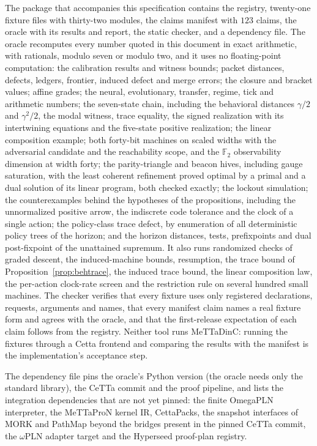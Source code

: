 \documentclass[11pt]{article}
\newcommand{\F}{\mathbb{F}}
\theoremstyle{definition}
\theoremstyle{plain}
\begin{document}
The package that accompanies this specification contains the registry, twenty-one fixture files
with thirty-two modules, the claims manifest with $123$ claims, the oracle with its results and
report, the static checker, and a dependency file. The oracle recomputes every number quoted in this
document in exact arithmetic, with rationals, modulo seven or modulo two, and it uses no
floating-point computation: the calibration results and witness
bounds; packet distances, defects, ledgers, frontier, induced defect and merge errors; the closure
and bracket values; affine grades; the neural, evolutionary, transfer, regime, tick and arithmetic
numbers; the seven-state chain, including the behavioral distances $\gamma/2$ and $\gamma^2/2$, the
modal witness, trace equality, the signed realization with its intertwining equations and the
five-state positive realization; the linear composition example; both forty-bit machines on scaled
widths with the adversarial candidate and the reachability scope, and the $\F_2$ observability
dimension at width forty; the parity-triangle and beacon hives, including gauge saturation, with the
least coherent refinement proved optimal by a primal and a dual solution of its linear program,
both checked exactly; the lockout simulation; the counterexamples behind the hypotheses of the
propositions, including the unnormalized positive arrow, the indiscrete code tolerance and the
clock of a single action; the policy-class trace defect, by enumeration of all deterministic policy
trees of the horizon; and the horizon distances, tests, prefixpoints and dual post-fixpoint of the
unattained supremum. It also runs randomized checks of graded descent, the induced-machine bounds,
resumption, the trace bound of Proposition~\ref{prop:behtrace}, the induced trace bound, the linear
composition law, the per-action clock-rate screen and the restriction rule on several hundred small
machines. The checker verifies that every fixture uses
only registered declarations, requests, arguments and names, that every manifest claim names a real
fixture form and agrees with the oracle, and that the first-release expectation of each claim
follows from the registry. Neither tool runs MeTTaDinC: running the fixtures through a Cetta frontend
and comparing the results with the manifest is the implementation's acceptance step.

The dependency file pins the oracle's Python version (the oracle needs only the standard library),
the CeTTa commit and the proof pipeline, and lists the integration dependencies that are not yet
pinned: the finite OmegaPLN
interpreter, the MeTTaProN kernel IR, CettaPacks, the snapshot interfaces of MORK and PathMap beyond
the bridges present in the pinned CeTTa commit, the $\omega$PLN adapter target and the Hyperseed
proof-plan registry.
\end{document}

